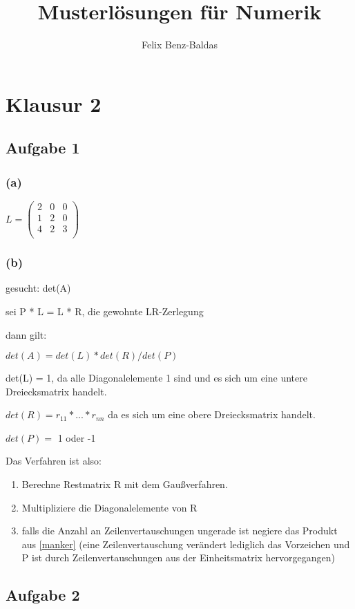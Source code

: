 \documentclass[a4paper]{article}
\title{Musterlösungen für Numerik}
\author{Felix Benz-Baldas}
\begin{document}
\maketitle

\section{Klausur 2}
\subsection{Aufgabe 1}
\subsubsection*{(a)}

$
L =
\begin{pmatrix}
2 & 0 & 0 \\
1 & 2 & 0 \\
4 & 2 & 3 \\
\end{pmatrix}
$


\subsubsection*{(b)}
gesucht: det(A)

sei P * L = L * R, die gewohnte LR-Zerlegung

dann gilt:

$det(A) = det(L) * det(R) / det(P)$

det(L) = 1, da alle Diagonalelemente 1 sind und es sich um eine untere Dreiecksmatrix handelt.

$ det(R) = r_{11} * ... * r_{nn} $ da es sich um eine obere Dreiecksmatrix handelt.


$ det(P) = $ 1 oder -1

Das Verfahren ist also:
\begin{enumerate}
\item Berechne Restmatrix R mit dem Gaußverfahren.
\item \label{manker} Multipliziere die Diagonalelemente von R
\item falls die Anzahl an Zeilenvertauschungen ungerade ist negiere das Produkt aus \ref{manker} (eine Zeilenvertauschung verändert lediglich das Vorzeichen und P ist durch Zeilenvertauschungen aus der Einheitsmatrix hervorgegangen)
\end{enumerate}

\subsection{Aufgabe 2}
\end{document}
